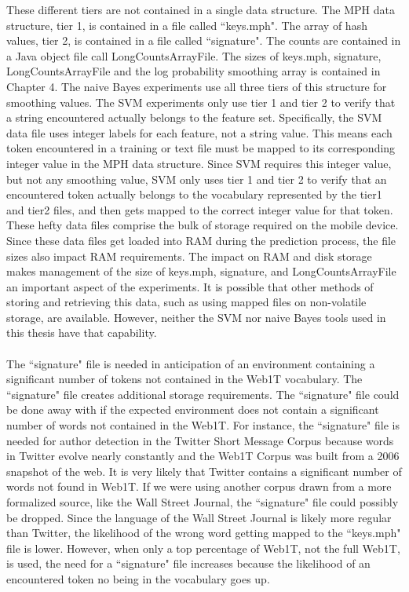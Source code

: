 		These different tiers are not contained in a single data structure.  The MPH data structure, tier 1, is contained in a file called ``keys.mph".  The array of hash values, tier 2, is contained in a file called ``signature".  The counts are contained in a Java object file call LongCountsArrayFile. The sizes of keys.mph, signature, LongCountsArrayFile and the log probability smoothing array is contained in Chapter 4. The naive Bayes experiments use all three tiers of this structure for smoothing values.  The SVM experiments only use tier 1 and tier 2 to verify that a string encountered actually belongs to the feature set.  Specifically, the SVM data file uses integer labels for each feature, not a string value.  This means each token encountered in a training or text file must be mapped to its corresponding integer value in the MPH data structure.  Since SVM requires this integer value, but not any smoothing value, SVM only uses tier 1 and tier 2 to verify that an encountered token actually belongs to the vocabulary represented by the tier1 and tier2 files, and then gets mapped to the correct integer value for that token. These hefty data files comprise the bulk of storage required on the mobile device.  Since these data files get loaded into RAM during the prediction process, the file sizes also impact RAM requirements. The impact on RAM and disk storage makes management of the size of keys.mph, signature, and LongCountsArrayFile an important aspect of the experiments.  It is possible that other methods of storing and retrieving this data, such as using mapped files on non-volatile storage, are available. However, neither the SVM nor naive Bayes tools used in this thesis have that capability.

	\paragraph*{} The ``signature" file is needed in anticipation of an environment containing a significant number of tokens not contained in the Web1T vocabulary.  The ``signature" file creates additional storage requirements.  The ``signature" file could be done away with if the expected environment does not contain a significant number of words not contained in the Web1T.  For instance, the ``signature" file is needed for author detection in the Twitter Short Message Corpus because words in Twitter evolve nearly constantly and the Web1T Corpus was built from a 2006 snapshot of the web.  It is very likely that Twitter contains a significant number of words not found in Web1T.  If we were using another corpus drawn from a more formalized source, like the Wall Street Journal, the ``signature" file could possibly be dropped.  Since the language of the Wall Street Journal is likely more regular than Twitter, the likelihood of the wrong word getting mapped to the ``keys.mph" file is lower.  However, when only a top percentage of Web1T, not the full Web1T, is used, the need for a ``signature" file increases because the likelihood of an encountered token no being in the vocabulary goes up.

